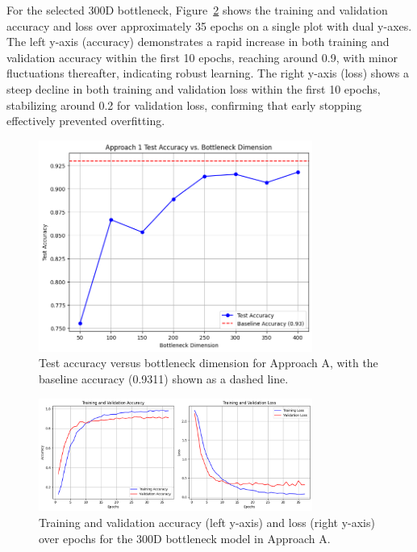 \documentclass[12pt]{article}
\begin{document}
For the selected 300D bottleneck, Figure~\ref{fig:train_progress_300d} shows the training and validation accuracy and loss over approximately 35 epochs on a single plot with dual y-axes. The left y-axis (accuracy) demonstrates a rapid increase in both training and validation accuracy within the first 10 epochs, reaching around 0.9, with minor fluctuations thereafter, indicating robust learning. The right y-axis (loss) shows a steep decline in both training and validation loss within the first 10 epochs, stabilizing around 0.2 for validation loss, confirming that early stopping effectively prevented overfitting.

\begin{figure}[h]
    \centering
    \includegraphics[width=0.8\textwidth]{choose_vec.png}
    \caption{Test accuracy versus bottleneck dimension for Approach A, with the baseline accuracy (0.9311) shown as a dashed line.}
    \label{fig:test_acc_bottleneck}
\end{figure}

\begin{figure}[h]
    \centering
    \includegraphics[width=0.8\textwidth]{train_a.png}
    \caption{Training and validation accuracy (left y-axis) and loss (right y-axis) over epochs for the 300D bottleneck model in Approach A.}
    \label{fig:train_progress_300d}
\end{figure}
\end{document}
